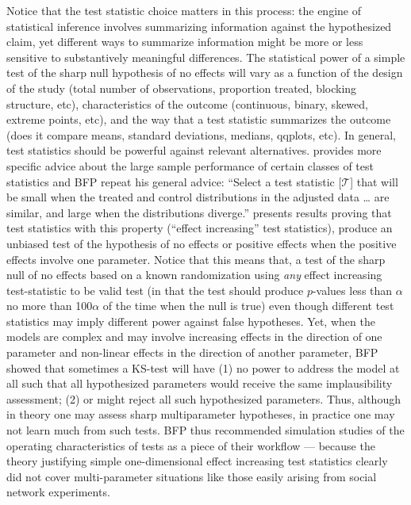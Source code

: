 Notice that the test statistic choice matters in this process: the engine of
statistical inference involves summarizing information against the
hypothesized claim, yet different ways to summarize information might be more
or less sensitive to substantively meaningful differences. The statistical
power of a simple test of the sharp null hypothesis of no effects will vary as
a function of the design of the study (total number of observations, proportion treated, blocking structure,
etc), characteristics of the outcome (continuous, binary, skewed, extreme
points, etc), and the way that a test statistic summarizes the outcome (does
it compare means, standard deviations, medians, qqplots, etc). In general,
test statistics should be powerful against relevant alternatives. \citet[\S 2.4.4]{rosenbaum:2002} provides more specific
advice about the large sample performance of certain classes of test statistics
and BFP repeat his general advice: ``Select a test statistic [$\mathcal{T}$] that will be
small when the treated and control distributions in the adjusted data \ldots
are similar, and large when the distributions diverge.'' \cite[Proposition 4
and 5, \S 2.9]{rosenbaum:2002} presents results proving that test statistics
with this property (``effect increasing'' test statistics), produce an
unbiased test of the hypothesis of no effects or positive effects when the
positive effects involve one parameter. Notice that this means that, a test of
the sharp null of no effects
based on a known randomization using \emph{any} effect increasing
test-statistic to be valid test (in that the test should produce $p$-values
less than $\alpha$ no more than 100$\alpha$ of the time when the null is true) even though different
test statistics may imply different power against false hypotheses.  Yet, when the models are complex and
may involve increasing effects in the direction of one parameter and
non-linear effects in the direction of another parameter, BFP showed that
sometimes a KS-test will have (1) no power to address the model at all such
that all hypothesized parameters would receive the same implausibility
assessment; (2) or might reject all such hypothesized parameters. Thus,
although in theory one may assess sharp multiparameter hypotheses,
 in practice one may not learn much from such tests. BFP thus recommended simulation studies of the operating
characteristics of tests as a piece of their workflow --- because  the theory
justifying simple one-dimensional effect increasing test statistics clearly
did not cover multi-parameter situations like those easily arising from social
network experiments.

